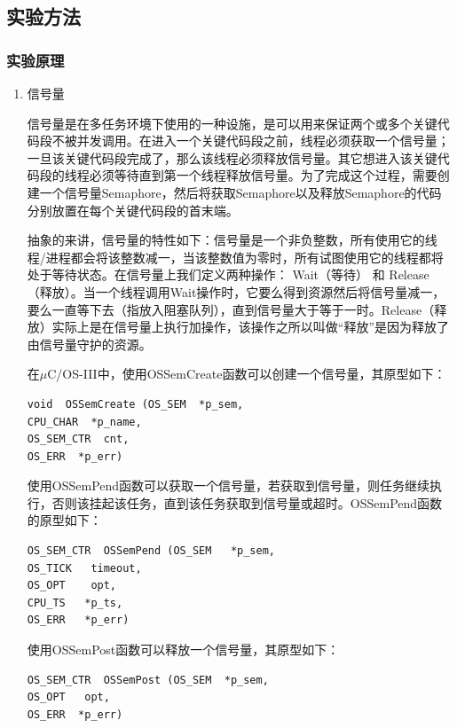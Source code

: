 ﻿\documentclass[UTF8,12pt]{article}
\begin{document}
\subsection{实验方法}

\subsubsection{实验原理}

\begin{enumerate}
  \item 信号量
  
  信号量是在多任务环境下使用的一种设施，是可以用来保证两个或多个关键代码段不被并发调用。在进入一个关键代码段之前，线程必须获取一个信号量；一旦该关键代码段完成了，那么该线程必须释放信号量。其它想进入该关键代码段的线程必须等待直到第一个线程释放信号量。为了完成这个过程，需要创建一个信号量Semaphore，然后将获取Semaphore以及释放Semaphore的代码分别放置在每个关键代码段的首末端。

  抽象的来讲，信号量的特性如下：信号量是一个非负整数，所有使用它的线程/进程都会将该整数减一，当该整数值为零时，所有试图使用它的线程都将处于等待状态。在信号量上我们定义两种操作： Wait（等待） 和 Release（释放）。当一个线程调用Wait操作时，它要么得到资源然后将信号量减一，要么一直等下去（指放入阻塞队列），直到信号量大于等于一时。Release（释放）实际上是在信号量上执行加操作，该操作之所以叫做“释放”是因为释放了由信号量守护的资源。

  在$\mu$C/OS-III中，使用OSSemCreate函数可以创建一个信号量，其原型如下：

  \begin{lstlisting}[frame=shadowbox]
void  OSSemCreate (OS_SEM  *p_sem, 
CPU_CHAR  *p_name,
OS_SEM_CTR  cnt,
OS_ERR  *p_err) 

  \end{lstlisting}
  使用OSSemPend函数可以获取一个信号量，若获取到信号量，则任务继续执行，否则该挂起该任务，直到该任务获取到信号量或超时。OSSemPend函数的原型如下：

  \begin{lstlisting}[frame=shadowbox]
OS_SEM_CTR  OSSemPend (OS_SEM   *p_sem,
OS_TICK   timeout,
OS_OPT    opt,
CPU_TS   *p_ts,
OS_ERR   *p_err)
  \end{lstlisting}
  使用OSSemPost函数可以释放一个信号量，其原型如下：

  \begin{lstlisting}[frame=shadowbox]
OS_SEM_CTR  OSSemPost (OS_SEM  *p_sem,
OS_OPT   opt,
OS_ERR  *p_err)

  \end{lstlisting}


\end{enumerate}
\end{document}
